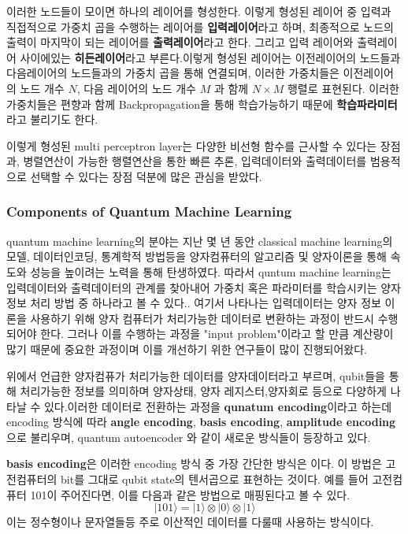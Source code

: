       이러한 노드들이 모이면 하나의 레이어를 형성한다. 이렇게 형성된 레이어 중 입력과 직접적으로 가중치 곱을 수행하는 레이어를 \textbf{입력레이어}라고 하며, 최종적으로 노드의 출력이 마지막이 되는 레이어를 \textbf{출력레이어}라고 한다. 그리고 입력 레이어와 출력레이어 사이에있는 \textbf{히든레이어}라고 부른다.\cite{popescu2009multilayer}이렇게 형성된 레이어는 이전레이어의 노드들과 다음레이어의 노드들과의 가중치 곱을 통해 연결되며, 이러한 가중치들은 이전레이어의 노드 개수 $N$, 다음 레이어의 노드 개수 $M$ 과 함께 $N \times M $ 행렬로 표현된다. 이러한 가중치들은 편향과 함께 Backpropagation을 통해 학습가능하기 때문에 \textbf{학습파라미터}라고 불리기도 한다.

      이렇게 형성된 multi perceptron layer는 다양한 비선형 함수를 근사할 수 있다는 장점과, 병렬연산이 가능한 행렬연산을 통한 빠른 추론, 입력데이터와 출력데이터를 범용적으로 선택할 수 있다는 장점 덕분에 많은 관심을 받았다.





\subsubsection{Components of Quantum Machine Learning}
quantum machine learning의 분야는 지난 몇 년 동안 classical machine learning의 모델, 데이터인코딩, 통계학적 방법등을 양자컴퓨터의 알고리즘 및 양자이론을 통해 속도와 성능을 높이려는 노력을 통해 탄생하였다. 따라서 quntum machine learning는 입력데이터와 출력데이터의 관계를 찾아내어 가중치 혹은 파라미터를 학습시키는 양자 정보 처리 방법 중 하나라고 볼 수 있다.\cite{schuld2015introduction}. 여기서 나타나는 입력데이터는 양자 정보 이론을 사용하기 위해 양자 컴퓨터가 처리가능한 데이터로 변환하는 과정이 반드시 수행되어야 한다. 그러나 이를 수행하는 과정을 "input problem"이라고 할 만큼 계산량이 많기 때문에 중요한 과정이며 이를 개선하기 위한 연구들이 많이 진행되어왔다.\cite{biamonte2017quantum}


    위에서 언급한 양자컴퓨가 처리가능한 데이터를 양자데이터라고 부르며, qubit들을 통해 처리가능한 정보를 의미하며 양자상태, 양자 레지스터,양자회로 등으로 다양하게 나타날 수 있다.이러한 데이터로 전환하는 과정을 \textbf{qunatum encoding}이라고 하는데 encoding 방식에 따라 \textbf{angle encoding}, \textbf{basis encoding}, \textbf{amplitude encoding}으로 불리우며, quantum autoencoder 와 같이 새로운 방식들이 등장하고 있다.\cite{rath2023quantum}

    \textbf{basis encoding}은 이러한 encoding 방식 중 가장 간단한 방식은  이다. 이 방법은 고전컴퓨터의 bit를 그대로 qubit state의 텐서곱으로 표현하는 것이다. 예를 들어 고전컴퓨터 101이 주어진다면, 이를 다음과 같은 방법으로 매핑된다고 볼 수 있다.
    \[
    |101\rangle = |1\rangle \otimes |0\rangle \otimes |1\rangle
    \]
    이는 정수형이나 문자열들등 주로 이산적인 데이터를 다룰때 사용하는 방식이다.

